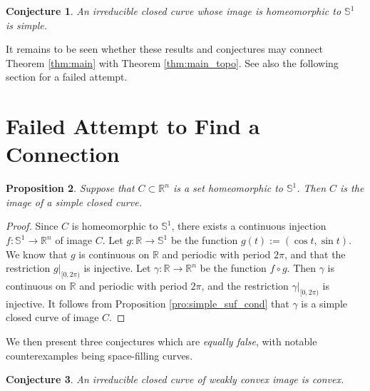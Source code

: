\documentclass{amsart}
\newtheorem{proposition}{Proposition}[section]
\newtheorem{conjecture}[proposition]{Conjecture}
\theoremstyle{definition}
\theoremstyle{remark}
\begin{document}

\begin{conjecture}
    \label{con:irr_simple}
    An irreducible closed curve whose image is homeomorphic to
    $\mathbb{S}^1$ is simple.
\end{conjecture}

It remains to be seen whether these results and conjectures may
connect Theorem \ref{thm:main} with Theorem \ref{thm:main_topo}.
See also the following section for a failed attempt.

\section{Failed Attempt to Find a Connection}

\begin{proposition}
    \label{pro:simple_par}
    Suppose that $C\subset\mathbb{R}^n$ is a set
    homeomorphic to $\mathbb{S}^1$. Then
    $C$ is the image of a simple closed curve.
\end{proposition}

\begin{proof}
    Since $C$ is homeomorphic to $\mathbb{S}^1$,
    there exists a continuous injection
    $f:\mathbb{S}^1\to\mathbb{R}^n$ of image $C$.
    Let $g:\mathbb{R}\to\mathbb{S}^1$ be the function
    $g(t):=(\cos t,\sin t)$. We know that $g$ is continuous
    on $\mathbb{R}$ and periodic with period $2\pi$, and that
    the restriction $g|_{[0,2\pi)}$ is injective.
    Let $\gamma:\mathbb{R}\to\mathbb{R}^n$ be the function
    $f\circ g$. Then $\gamma$ is continuous
    on $\mathbb{R}$ and periodic with period $2\pi$, and the
    restriction $\gamma|_{[0,2\pi)}$ is injective.
    It follows from Proposition \ref{pro:simple_suf_cond}
    that $\gamma$ is a simple closed curve of image $C$.
\end{proof}

We then present three conjectures which are \emph{equally false},
with notable counterexamples being space-filling curves.

\begin{conjecture}
    \label{con:irr_convex}
    An irreducible closed curve of weakly convex image is convex.
\end{conjecture}
\end{document}
